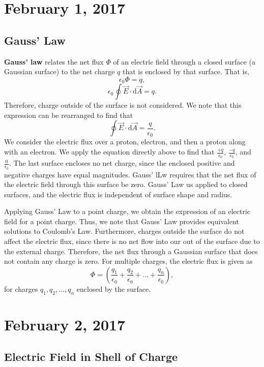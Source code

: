 \documentclass[11pt]{article}
\theoremstyle{plain} %
\theoremstyle{definition}
\theoremstyle{example}
\theoremstyle{remark}
\begin{document}
\section{February 1, 2017}
\subsection{Gauss' Law}

\textbf{Gauss' law} relates the net flux $\Phi$ of an electric field through a closed surface (a Gaussian surface) to the net charge $q$ that is enclosed by that surface. That is,
$$\epsilon_0\Phi = q,$$
$$\epsilon_0\oint \vec{E} \cdot \mathrm d \vec{A} = q.$$
Therefore, charge outside of the surface is not considered. We note that this expression can be rearranged to find that 
$$\oint \vec{E} \cdot \mathrm d \vec{A} = \frac{q}{\epsilon_0}.$$
We consider the electric flux over a proton, electron, and then a proton along with an electron. We apply the equation directly above to find that $\frac{+q}{\epsilon_0}$, $\frac{-q}{\epsilon_0}$, and $\frac{0}{\epsilon_0}.$ The last surface encloses no net charge, since the enclosed positive and negative charges have equal magnitudes. Gauss' lLw requires that the net flux of the electric field through this surface be zero. Gauss' Law us applied to closed surfaces, and the electric flux is independent of surface shape and radius. 

Applying Gauss' Law to a point charge, we obtain the expression of an electric field for a point charge. Thus, we note that Gauss' Law provides equivalent solutions to Coulomb's Law. Furthermore, charges outside the surface do not affect the electric flux, since there is no net flow into our out of the surface due to the external charge. Therefore, the net flux through a Gaussian surface that does not contain any charge is zero. For multiple charges, the electric flux is given as
$$\Phi = \left(\frac{q_1}{\epsilon_0} + \frac{q_2}{\epsilon_0}+...+\frac{q_n}{\epsilon_0}\right),$$
for charges $q_1, q_2, ...,q_n$ enclosed by the surface. 

\section{February 2, 2017}
\subsection{Electric Field in Shell of Charge}
\end{document}
